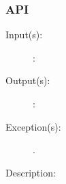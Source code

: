 \subsubsection{API}
\begin{description}
\label{thd_}
\item[{\cfunc[]{thd\_}{}}: ]
	\begin{description}\item[]
	\item[Input(s): ]
		\begin{description}\item[]
		\item[: ]
		\end{description}
	\item[Output(s): ]
		\begin{description}\item[]
		\item[: ]
		\end{description}
	\item[Exception(s): ]
		\begin{description}\item[]
		\item[.]
		\end{description}
	\item[Description: ]
	\end{description}
\end{description}
